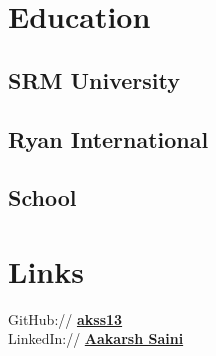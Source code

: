 \documentclass[]{deedy-resume-openfont}
\begin{document}
\begin{minipage}[t][18cm]{0.33\textwidth} 


\section{Education} 

\subsection{SRM University}
\sectionsep

\subsection{Ryan International}
\subsection{School}
\sectionsep


\section{Links} 
GitHub:// \href{https://github.com/akss13}{\bf akss13} \\
LinkedIn://  \href{https://www.linkedin.com/in/aakarsh-saini-609a86178/}{\bf Aakarsh Saini} \\




\end{minipage}
\end{document}

